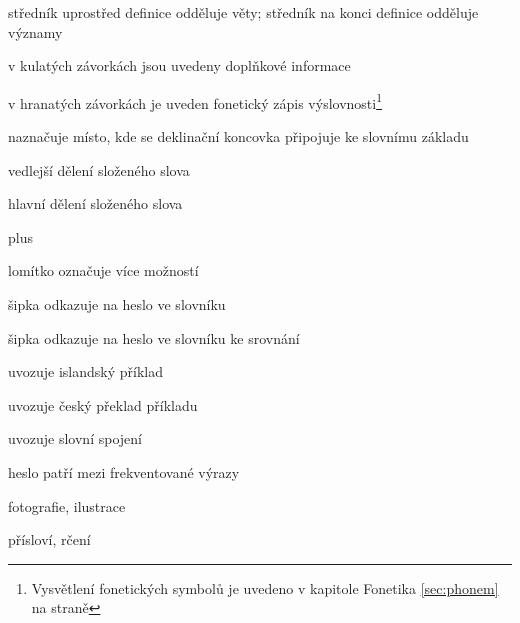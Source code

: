 \item[{;}] {středník uprostřed definice odděluje věty; středník na konci definice odděluje významy}

\item[{(...)}] {v kulatých závorkách jsou uvedeny doplňkové informace}
\item[{[...]}] {v hranatých závorkách je uveden fonetický zápis výslovnosti}\footnote{Vysvětlení fonetických symbolů je uvedeno v kapitole Fonetika \ref{sec:phonem} na straně \pageref{sec:phonem}}
\item[{|}] {naznačuje místo, kde se deklinační koncovka připojuje ke slovnímu základu}
\item[{·}] {vedlejší dělení složeného slova}
\item[{··}] {hlavní dělení složeného slova}
\item[{+}] {plus}
\item[{/}] {lomítko označuje více možností}
\item[{\dicsymSee}] {šipka odkazuje na heslo ve slovníku}
\item[{\dicsymCompare}] {šipka odkazuje na heslo ve slovníku ke srovnání}
\item[{\dicsymExampleIS}] {uvozuje islandský příklad}
\item[{\dicsymExampleCS}] {uvozuje český překlad příkladu}
\item[{\dicsymIdiom}] {uvozuje slovní spojení}
\item[{\dicsymFrequent}] {heslo patří mezi frekventované výrazy}

\item[{\dicsymPhoto}] {fotografie, ilustrace}
\item[{\dicsymProverb}] {přísloví, rčení}
